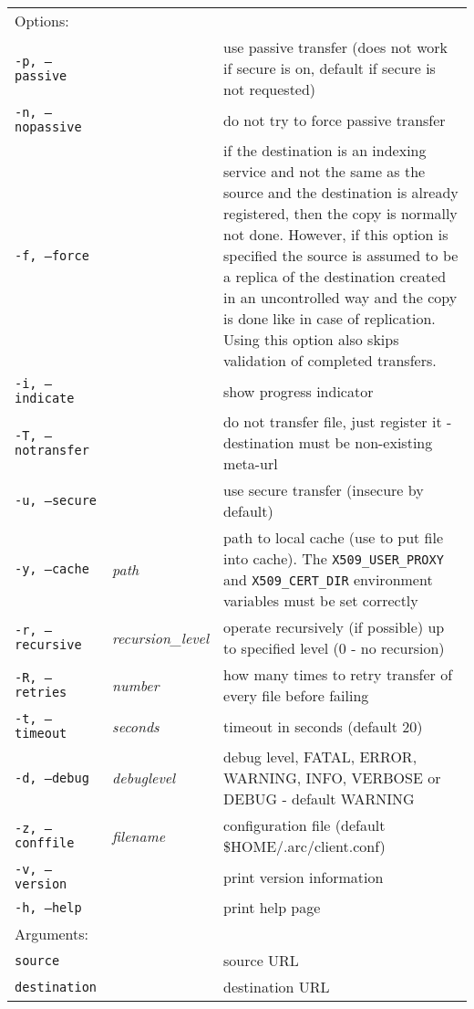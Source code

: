 \begin{longtable}{llp{8cm}}
    Options:&&\\
   \texttt{-p, --passive} && use passive transfer (does not work if secure is on, default if secure is not requested)\\
   \texttt{-n, --nopassive} && do not try to force passive transfer\\
   \texttt{-f, --force} && if the destination is an indexing service and not the same as the source and the destination is already registered, then the copy is normally not done. However, if this option is specified the source is assumed to be a replica of the destination created in an uncontrolled way and the copy is done like in case of replication. Using this option also skips validation of completed transfers.\\
   \texttt{-i, --indicate} && show progress indicator\\
   \texttt{-T, --notransfer} && do not transfer file, just register it - destination must be non-existing meta-url\\
   \texttt{-u, --secure} && use secure transfer (insecure by default)\\
   \texttt{-y, --cache} &\textit{path} & path to local cache (use to put file into cache). The \texttt{X509\_USER\_PROXY} and \texttt{X509\_CERT\_DIR} environment variables must be set correctly\\
   \texttt{-r, --recursive} & \textit{recursion\_level} & operate recursively (if possible) up to specified level (0 - no recursion)\\
   \texttt{-R, --retries} & \textit{number} & how many times to retry transfer of every file before failing\\
   \texttt{-t, --timeout}&\textit{seconds}&timeout in seconds (default 20)\\
   \texttt{-d, --debug}&\textit{debuglevel}&debug level, FATAL, ERROR, WARNING, INFO, VERBOSE or DEBUG - default WARNING\\
   \texttt{-z, --conffile}&\textit{filename}& configuration file (default {\$}HOME/.arc/client.conf)\\
   \texttt{-v, --version}&&print version information\\
   \texttt{-h, --help}&&print help page\\
    Arguments:&&\\
    \texttt{source} && source URL\\
    \texttt{destination} && destination URL\\
\end{longtable}

